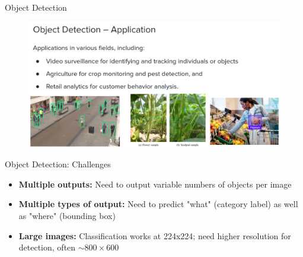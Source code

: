 \begin{frame}[allowframebreaks]{Object Detection}
    \begin{figure}
        \centering
        \includegraphics[width=1.02\textwidth,height=0.9\textheight,keepaspectratio]{images/object-detect/intro-3.png}
    \end{figure}
    
\end{frame}

\begin{frame}{Object Detection: Challenges}
    \begin{itemize}
        \item \textbf{Multiple outputs:} Need to output variable numbers of objects per image
        \item \textbf{Multiple types of output:} Need to predict "what" (category label) as well as "where" (bounding box)
        \item \textbf{Large images:} Classification works at 224x224; need higher resolution for detection, often $\sim 800 \times 600$
    \end{itemize}
\end{frame}

